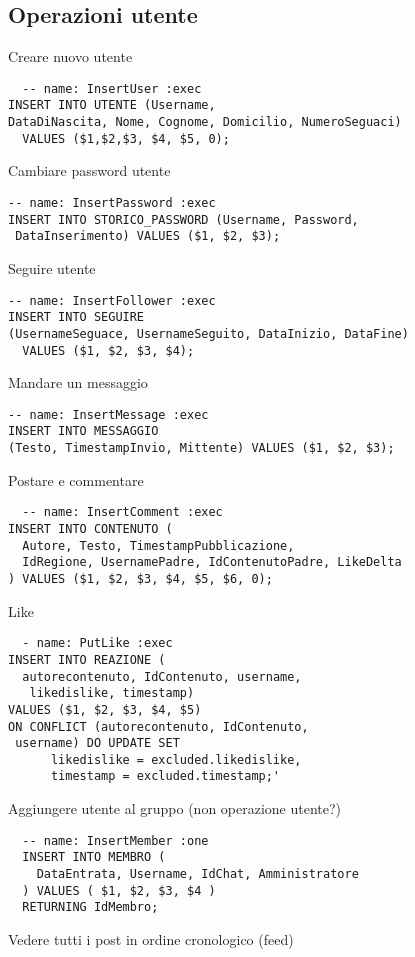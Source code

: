 \documentclass[a4paper,12pt]{report}
\begin{document}
\subsection{Operazioni utente}
Creare nuovo utente
\begin{lstlisting}
  -- name: InsertUser :exec
INSERT INTO UTENTE (Username, 
DataDiNascita, Nome, Cognome, Domicilio, NumeroSeguaci) 
  VALUES ($1,$2,$3, $4, $5, 0);

\end{lstlisting}

Cambiare password utente
\begin{lstlisting}
-- name: InsertPassword :exec
INSERT INTO STORICO_PASSWORD (Username, Password,
 DataInserimento) VALUES ($1, $2, $3);
\end{lstlisting}

Seguire utente
\begin{lstlisting}
-- name: InsertFollower :exec
INSERT INTO SEGUIRE 
(UsernameSeguace, UsernameSeguito, DataInizio, DataFine)
  VALUES ($1, $2, $3, $4);
\end{lstlisting}

Mandare un messaggio
\begin{lstlisting}
-- name: InsertMessage :exec
INSERT INTO MESSAGGIO 
(Testo, TimestampInvio, Mittente) VALUES ($1, $2, $3);
\end{lstlisting}

Postare e commentare
\begin{lstlisting}
  -- name: InsertComment :exec
INSERT INTO CONTENUTO (
  Autore, Testo, TimestampPubblicazione, 
  IdRegione, UsernamePadre, IdContenutoPadre, LikeDelta
) VALUES ($1, $2, $3, $4, $5, $6, 0);
\end{lstlisting}

Like 
\begin{lstlisting}
  - name: PutLike :exec
INSERT INTO REAZIONE ( 
  autorecontenuto, IdContenuto, username,
   likedislike, timestamp)
VALUES ($1, $2, $3, $4, $5)
ON CONFLICT (autorecontenuto, IdContenuto,
 username) DO UPDATE SET 
      likedislike = excluded.likedislike,
      timestamp = excluded.timestamp;'
\end{lstlisting}

Aggiungere utente al gruppo  (non operazione utente?)
\begin{lstlisting}
  -- name: InsertMember :one
  INSERT INTO MEMBRO (
    DataEntrata, Username, IdChat, Amministratore
  ) VALUES ( $1, $2, $3, $4 )
  RETURNING IdMembro;
\end{lstlisting}
Vedere tutti i post in ordine cronologico (feed)
\end{document}
